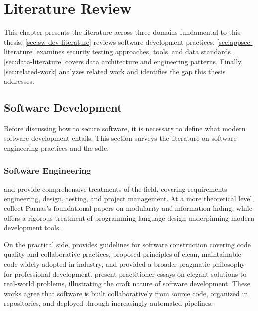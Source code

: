\chapter{Literature Review}
\label{ch:literature-review}

This chapter presents the literature across three domains fundamental to this thesis. \autoref{sec:sw-dev-literature} reviews software development practices. \autoref{sec:appsec-literature} examines security testing approaches, tools, and data standards. \autoref{sec:data-literature} covers data architecture and engineering patterns. Finally, \autoref{sec:related-work} analyzes related work and identifies the gap this thesis addresses.


\section{Software Development}
\label{sec:sw-dev-literature}

Before discussing how to secure software, it is necessary to define what modern software development entails. This section surveys the literature on software engineering practices and the \gls{sdlc}.

\subsection{Software Engineering}

\textcite{Sommerville2015} and \textcite{Pressman2019} provide comprehensive treatments of the field, covering requirements engineering, design, testing, and project management. At a more theoretical level, \textcite{Hoffman2001} collect Parnas's foundational papers on modularity and information hiding, while \textcite{Scott2015} offers a rigorous treatment of programming language design underpinning modern development tools.

On the practical side, \textcite{McConnell2004} provides guidelines for software construction covering code quality and collaborative practices, \textcite{Martin2008} proposed principles of clean, maintainable code widely adopted in industry, and \textcite{Hunt2019} provided a broader pragmatic philosophy for professional development. \textcite{Oram2007} present practitioner essays on elegant solutions to real-world problems, illustrating the craft nature of software development. These works agree that software is built collaboratively from source code, organized in repositories, and deployed through increasingly automated pipelines.

